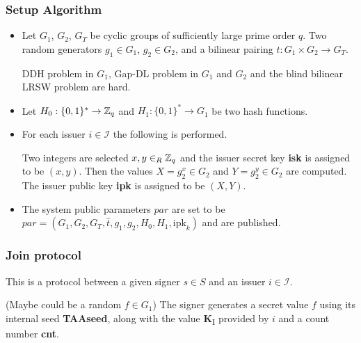 \subsubsection*{Setup Algorithm}
\begin{itemize}[align = left, leftmargin=*, label={--}]
\item Let $G_1$, $G_2$, $G_T$ be cyclic groups of sufficiently large prime order $q$. Two random generators $g_1 \in G_1$, $g_2 \in G_2$, and a bilinear pairing $\hat{t}: G_1 \times G_2 \rightarrow G_T$.

DDH problem in $G_1$, Gap-DL problem in $G_1$ and $G_2$ and the blind bilinear LRSW problem are hard.

\item Let $H_0 : \{0,1\}^\ast \rightarrow {\mathbb Z}_q$ and $H_1 : \{ 0 , 1 \}^\ast \rightarrow G_1$ be two hash functions.

\item For each issuer $i \in \mathcal{I}$ the following is performed.

Two integers are selected $x,y \in_R {\mathbb Z}_q$ and the issuer secret key \textbf{isk} is assigned to be $(x,y)$. Then the values $X = g_2^{x} \in G_2$ and $Y = g_2^{y} \in G_2$ are computed. The issuer public key \textbf{ipk} is assigned to be $(X,Y)$.

\item The system public parameters $par$ are set to be $par = (G_1, G_2, G_T, \hat{t}, g_1, g_2, H_0, H_1, \text{ipk}_k)$ and are published.
\end{itemize}
\subsubsection*{Join protocol}

This is a protocol between a given signer $s \in S$  and an issuer $i \in \mathcal{I}$.


(Maybe could be a random $f \in G_1$)
The signer generates a secret value $f$ using its internal seed \textbf{TAAseed}, along with the value \textbf{K}\textsubscript{I} provided by $i$ and a count number \textbf{cnt}.

